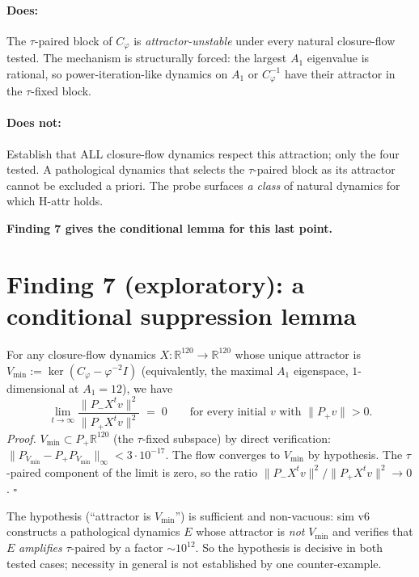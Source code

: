 \documentclass[11pt,a4paper]{article}
\newcommand{\Cphi}{C_\varphi}
\newcommand{\R}{\mathbb{R}}
\begin{document}
\paragraph{Does:} The $\tau$-paired block of $\Cphi$ is
\emph{attractor-unstable} under every natural closure-flow tested.
The mechanism is structurally forced: the largest $A_1$
eigenvalue is rational, so power-iteration-like dynamics on $A_1$
or $\Cphi^{-1}$ have their attractor in the $\tau$-fixed block.

\paragraph{Does not:} Establish that ALL closure-flow dynamics
respect this attraction; only the four tested. A pathological
dynamics that selects the $\tau$-paired block as its attractor
cannot be excluded a priori. The probe surfaces \emph{a class}
of natural dynamics for which H-attr holds.

\bigskip

\noindent
\textbf{Finding 7 gives the conditional lemma for this last point.}

\section{Finding 7 (exploratory): a conditional suppression lemma}
\label{sec:finding7}

\begin{findingbox}[title={Finding 7 (conditional suppression lemma)}]
For any closure-flow dynamics $X : \R^{120} \to \R^{120}$ whose
unique attractor is $V_{\min} := \ker(\Cphi - \varphi^{-2} I)$
(equivalently, the maximal $A_1$ eigenspace, $1$-dimensional at
$A_1 = 12$), we have
\[
\lim_{t \to \infty} \frac{\|P_- X^t v\|^2}{\|P_+ X^t v\|^2} \;=\; 0
\qquad \text{for every initial $v$ with $\|P_+ v\| > 0$.}
\]
\emph{Proof.} $V_{\min} \subset P_+ \R^{120}$ (the $\tau$-fixed
subspace) by direct verification:
$\|P_{V_{\min}} - P_+ P_{V_{\min}}\|_\infty < 3 \cdot 10^{-17}$.
The flow converges to $V_{\min}$ by hypothesis. The
$\tau$-paired component of the limit is zero, so the ratio
$\|P_- X^t v\|^2 / \|P_+ X^t v\|^2 \to 0$. $\square$

The hypothesis (``attractor is $V_{\min}$'') is sufficient and
non-vacuous: sim v6 constructs a pathological dynamics $E$ whose
attractor is \emph{not} $V_{\min}$ and verifies that $E$
\emph{amplifies}
$\tau$-paired by a factor $\sim 10^{12}$. So the hypothesis is decisive in both tested cases; necessity in general is not established by one counter-example.
\end{findingbox}
\end{document}
